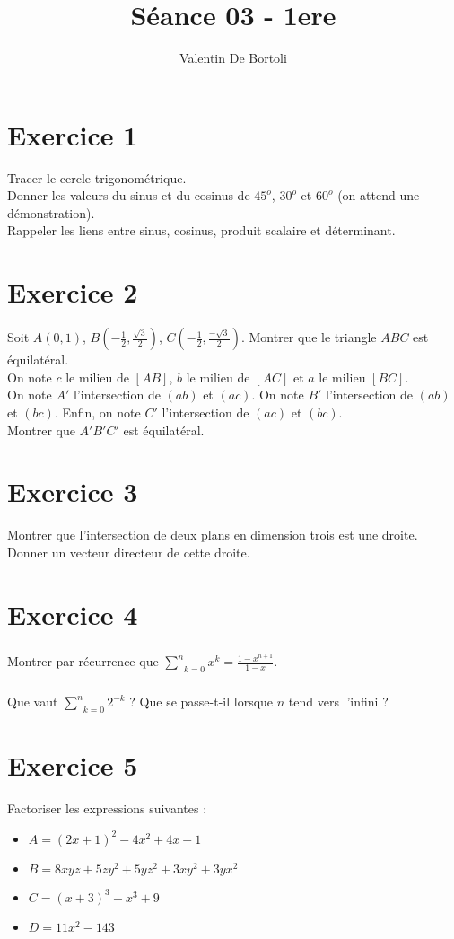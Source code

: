 \documentclass[10pt,a4paper]{article}
\title{Séance 03 - 1ere}
\author{Valentin De Bortoli}
\begin{document}
\maketitle

\section{Exercice 1}
Tracer le cercle trigonométrique.\\
Donner les valeurs du sinus et du cosinus de $45^o$, $30^o$ et $60^o$ (on attend une démonstration).\\
Rappeler les liens entre sinus, cosinus, produit scalaire et déterminant.

\section{Exercice 2}
Soit $A(0,1)$, $B(-\frac{1}{2}, \frac{\sqrt{3}}{2})$,
$C(-\frac{1}{2}, \frac{-\sqrt{3}}{2})$. Montrer que le triangle $ABC$ est équilatéral.\\
On note $c$ le milieu de $[AB]$, $b$ le milieu de $[AC]$ et $a$ le milieu $[BC]$.\\
On note $A'$ l'intersection de $(ab)$ et $(ac)$. On note $B'$ l'intersection de
$(ab)$ et $(bc)$. Enfin, on note $C'$ l'intersection de $(ac)$ et $(bc)$. \\
Montrer que $A'B'C'$ est équilatéral.

\section{Exercice 3}
Montrer que l'intersection de deux plans en dimension trois est une droite.\\
Donner un vecteur directeur de cette droite.

\section{Exercice 4}
\subparagraph{}Montrer par récurrence que $\underset{k=0}{\overset{n}{\sum}}x^k = \frac{1-x^{n+1}}{1-x}$.
\subparagraph{}Que vaut $\underset{k=0}{\overset{n}{\sum}}2^{-k}$ ? Que se passe-t-il lorsque $n$ tend vers l'infini ?

\section{Exercice 5}
Factoriser les expressions suivantes :
\begin{itemize}
\item $A = (2x+1) ^2 - 4x^2 +4x -1$
\item $B = 8xyz + 5zy^2 + 5 yz^2 + 3xy^2 + 3yx^2$
\item $C = (x+3)^3 - x^3 + 9$
\item $D = 11x^2 - 143$
\end{itemize}
\end{document}
